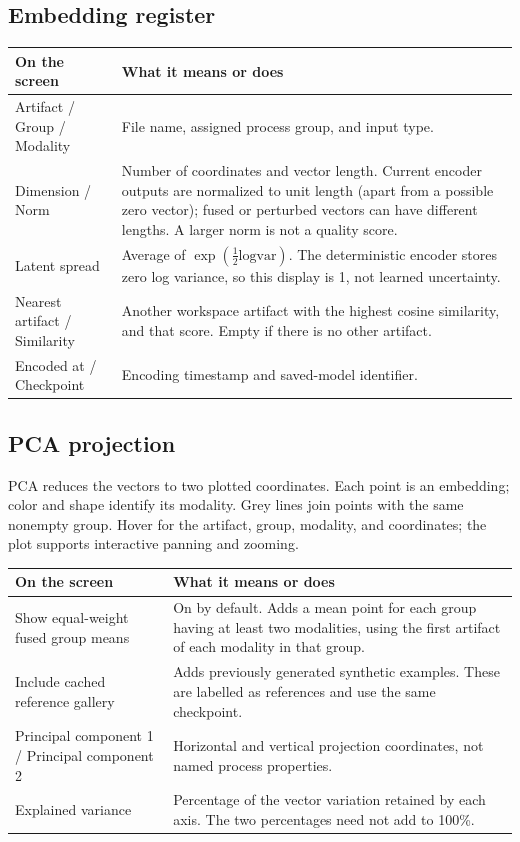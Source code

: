 \documentclass[11pt,a4paper]{article}
\makeatletter
\newenvironment{controls}{%
  \small\begin{longtable}{@{}>{\raggedright\arraybackslash}p{.34\linewidth}
    >{\raggedright\arraybackslash}p{.62\linewidth}@{}}
  \toprule\textbf{On the screen} & \textbf{What it means or does}\\\midrule\endhead
  \bottomrule\endfoot
}{\end{longtable}\normalsize}
\makeatother
\begin{document}
\subsection{Embedding register}
\begin{controls}
Artifact / Group / Modality & File name, assigned process group, and input type.\\
Dimension / Norm & Number of coordinates and vector length. Current encoder
outputs are normalized to unit length (apart from a possible zero vector);
fused or perturbed vectors can have different lengths. A larger norm is not
a quality score.\\
Latent spread & Average of $\exp(\tfrac12\text{logvar})$. The deterministic
encoder stores zero log variance, so this display is 1, not learned uncertainty.\\
Nearest artifact / Similarity & Another workspace artifact with the highest
cosine similarity, and that score. Empty if there is no other artifact.\\
Encoded at / Checkpoint & Encoding timestamp and saved-model identifier.\\
\end{controls}

\subsection{PCA projection}
PCA reduces the vectors to two plotted coordinates. Each point is an embedding;
color and shape identify its modality. Grey lines join points with the same
nonempty group. Hover for the artifact, group, modality, and coordinates;
the plot supports interactive panning and zooming.

\begin{controls}
Show equal-weight fused group means & On by default. Adds a mean point for
each group having at least two modalities, using the first artifact of each
modality in that group.\\
Include cached reference gallery & Adds previously generated synthetic
examples. These are labelled as references and use the same checkpoint.\\
Principal component 1 / Principal component 2 & Horizontal and vertical
projection coordinates, not named process properties.\\
Explained variance & Percentage of the vector variation retained by each
axis. The two percentages need not add to 100\%.\\
\end{controls}
\end{document}
